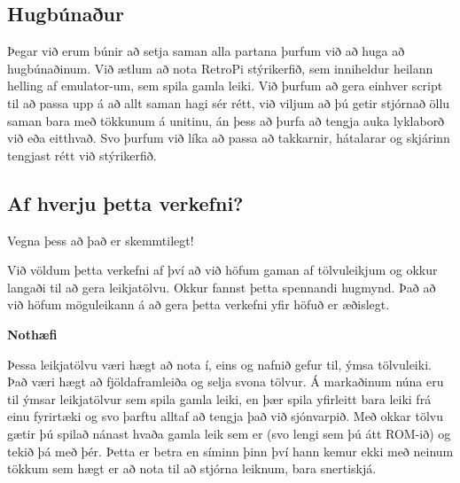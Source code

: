 \subsection{Hugbúnaður}

Þegar við erum búnir að setja saman alla partana þurfum við að huga að hugbúnaðinum. Við ætlum að nota RetroPi stýrikerfið, sem inniheldur heilann helling af emulator-um, sem spila gamla leiki. Við þurfum að gera einhver script til að passa upp á að allt saman hagi sér rétt, við viljum að þú getir stjórnað öllu saman bara með tökkunum á unitinu, án þess að þurfa að tengja auka lyklaborð við eða eitthvað. Svo þurfum við líka að passa að takkarnir, hátalarar og skjárinn tengjast rétt við stýrikerfið.

\subsection{Af hverju þetta verkefni?}

Vegna þess að það er skemmtilegt!

Við völdum þetta verkefni af því að við höfum gaman af tölvuleikjum og okkur langaði til að gera leikjatölvu. Okkur fannst þetta spennandi hugmynd. Það að við höfum möguleikann á að gera þetta verkefni yfir höfuð er æðislegt.

\textbf{Nothæfi}

Þessa leikjatölvu væri hægt að nota í, eins og nafnið gefur til, ýmsa tölvuleiki. Það væri hægt að fjöldaframleiða og selja svona tölvur. Á markaðinum núna eru til ýmsar leikjatölvur sem spila gamla leiki, en þær spila yfirleitt bara leiki frá einu fyrirtæki og svo þarftu alltaf að tengja það við sjónvarpið. Með okkar tölvu gætir þú spilað nánast hvaða gamla leik sem er (svo lengi sem þú átt ROM-ið) og tekið þá með þér. Þetta er betra en síminn þinn því hann kemur ekki með neinum tökkum sem hægt er að nota til að stjórna leiknum, bara snertiskjá.